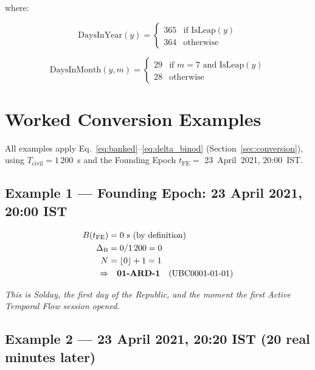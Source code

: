 \documentclass[journal,twoside]{IEEEtran}
\begin{document}
\noindent where:

\begin{equation}
\mathrm{DaysInYear}(y) =
\begin{cases}
365 & \text{if } \mathrm{IsLeap}(y) \\
364 & \text{otherwise}
\end{cases}
\end{equation}

\begin{equation}
\mathrm{DaysInMonth}(y,m) =
\begin{cases}
29 & \text{if } m = 7 \text{ and } \mathrm{IsLeap}(y) \\
28 & \text{otherwise}
\end{cases}
\end{equation}

\section{Worked Conversion Examples}
\label{sec:worked_examples}

All examples apply Eq.~\eqref{eq:banked}--\eqref{eq:delta_binod} (Section~\ref{sec:conversion}),
using $T_{\mathrm{civil}} = 1\,200$~s and the Founding Epoch $t_{\mathrm{FE}} = $ 23~April~2021,
20:00~IST.

\subsection{Example 1 --- Founding Epoch: 23 April 2021, 20:00 IST}

\begin{align}
B(t_{\mathrm{FE}}) &= 0 \text{ s (by definition)} \notag \\
\Delta_{\mathrm{B}} &= 0 / 1\,200 = 0 \notag \\
N &= \lfloor 0 \rfloor + 1 = 1 \notag \\
\Rightarrow & \quad \textbf{01-ARD-1} \quad (\text{UBC0001-01-01})
\end{align}

\noindent \textit{This is Solday, the first day of the Republic, and the moment the first
Active Temporal Flow session opened.}

\subsection{Example 2 --- 23 April 2021, 20:20 IST (20 real minutes later)}
\end{document}
